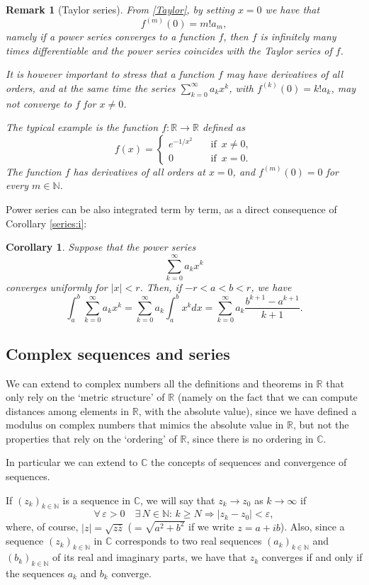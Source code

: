 \documentclass[a4paper,reqno]{amsart}
\numberwithin{equation}{section}
\newtheorem{corollary}[definition]{Corollary}
\newtheorem{remark}[definition]{Remark}
\def\C{\mathbb{C}}
\def\N{\mathbb{N}}
\def\R{\mathbb{R}}
\begin{document}
\begin{remark}[Taylor series]
From \eqref{Taylor}, by setting $x=0$ we have that 
$$
f^{(m)}(0) = m! a_m,
$$
namely if a power series converges to a function $f$, then $f$ is infinitely many times differentiable and the power series coincides with the Taylor series of $f$.

It is however important to stress that a function $f$ may have derivatives of all orders, and at the same time the series $\sum_{k=0}^\infty a_k x^k$, with $f^{(k)}(0) = k! a_k$, may not converge to $f$ for 
$x\neq 0$. 

The typical example is the function $f:\R\to \R$ defined as
$$
f(x) = \begin{cases}
e^{-1/x^2} \quad &\textrm{if } \, x\neq 0,\\
0 \quad &\textrm{if } \, x= 0.
\end{cases}
$$
The function $f$ has derivatives of all orders at $x=0$, and $f^{(m)}(0)=0$ for every $m\in \N$.
\end{remark} 

\bigskip

Power series can be also integrated term by term, as a direct consequence of Corollary \ref{series:i}:

\begin{corollary}
Suppose that the power series 
$$
\sum_{k=0}^\infty a_k x^k
$$
converges uniformly for $|x|<r$. Then, if $-r<a<b<r$, we have 
$$
\int_a^b \sum_{k=0}^\infty a_k x^k = \sum_{k=0}^\infty a_k \int_a^b x^k dx = \sum_{k=0}^\infty a_k \frac{b^{k+1}-a^{k+1}}{k+1}.
$$
\end{corollary}


\subsection{Complex sequences and series}
We can extend to complex numbers all the definitions and theorems in $\R$ that only rely on the `metric structure' of $\R$ (namely on the fact that we can compute 
distances among elements in $\R$, with the absolute value), since we have defined a modulus on complex numbers that mimics the absolute value in $\R$, but not the properties that rely on the `ordering' of $\R$, since there is no ordering in $\C$.

In particular we can extend to $\C$ the concepts of sequences and convergence of sequences. 

\noindent
If $(z_k)_{k\in \N}$ is a sequence in $\C$, we will say that $z_k\to z_0$ as $k\to \infty$ if
$$
\forall\, \varepsilon>0 \quad \exists\, N\in \N: \, k\geq N \Rightarrow |z_k-z_0|<\varepsilon,
$$
where, of course, $|z| = \sqrt{z\bar z}$ ($=\sqrt{a^2+b^2}$ if we write $z=a+ib$). Also, since a sequence $(z_k)_{k\in \N}$ in $\C$ corresponds to two real sequences $(a_k)_{k\in \N}$ and $(b_k)_{k\in \N}$ of its real and imaginary parts, 
we have that $z_k$ converges if and only if the sequences $a_k$ and $b_k$ converge.
\end{document}
